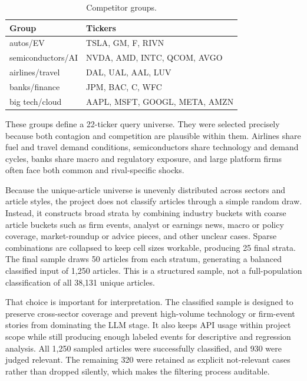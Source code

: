 \documentclass[11pt]{article}
\begin{document}
\begin{table}[H]
    \centering
    \caption{Competitor groups.}
    \small
    \begin{tabular}{ll}
        \toprule
        Group & Tickers \\
        \midrule
        autos/EV & TSLA, GM, F, RIVN \\
        semiconductors/AI & NVDA, AMD, INTC, QCOM, AVGO \\
        airlines/travel & DAL, UAL, AAL, LUV \\
        banks/finance & JPM, BAC, C, WFC \\
        big tech/cloud & AAPL, MSFT, GOOGL, META, AMZN \\
        \bottomrule
    \end{tabular}
\end{table}

These groups define a 22-ticker query universe. They were selected precisely because both contagion and competition are plausible within them. Airlines share fuel and travel demand conditions, semiconductors share technology and demand cycles, banks share macro and regulatory exposure, and large platform firms often face both common and rival-specific shocks.

Because the unique-article universe is unevenly distributed across sectors and article styles, the project does not classify articles through a simple random draw. Instead, it constructs broad strata by combining industry buckets with coarse article buckets such as firm events, analyst or earnings news, macro or policy coverage, market-roundup or advice pieces, and other unclear cases. Sparse combinations are collapsed to keep cell sizes workable, producing 25 final strata. The final sample draws 50 articles from each stratum, generating a balanced classified input of 1,250 articles. This is a structured sample, not a full-population classification of all 38,131 unique articles.

That choice is important for interpretation. The classified sample is designed to preserve cross-sector coverage and prevent high-volume technology or firm-event stories from dominating the LLM stage. It also keeps API usage within project scope while still producing enough labeled events for descriptive and regression analysis. All 1,250 sampled articles were successfully classified, and 930 were judged relevant. The remaining 320 were retained as explicit not-relevant cases rather than dropped silently, which makes the filtering process auditable.
\end{document}
